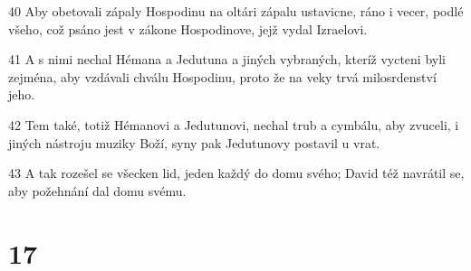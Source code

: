 \par 40 Aby obetovali zápaly Hospodinu na oltári zápalu ustavicne, ráno i vecer, podlé všeho, což psáno jest v zákone Hospodinove, jejž vydal Izraelovi.
\par 41 A s nimi nechal Hémana a Jedutuna a jiných vybraných, kteríž vycteni byli zejména, aby vzdávali chválu Hospodinu, proto že na veky trvá milosrdenství jeho.
\par 42 Tem také, totiž Hémanovi a Jedutunovi, nechal trub a cymbálu, aby zvuceli, i jiných nástroju muziky Boží, syny pak Jedutunovy postavil u vrat.
\par 43 A tak rozešel se všecken lid, jeden každý do domu svého; David též navrátil se, aby požehnání dal domu svému.

\chapter{17}

